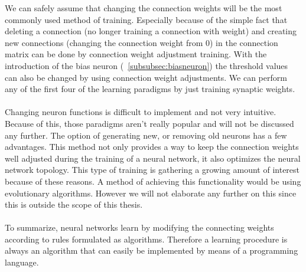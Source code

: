 \documentclass[pdftex,a4paper,12pt,twoside]{report}
\theoremstyle{plain} \newtheorem{theorem}{Theorem} \newtheorem{proposition}{Proposition} \newtheorem{lemma}{Lemma} \newtheorem*{corollary}{Corollary}
\theoremstyle{definition} \newtheorem{definition}{Definition} \newtheorem{conjecture}{Conjecture} \newtheorem*{example}{Example} \newtheorem{algorithm}{Algorithm}
\theoremstyle{remark} \newtheorem*{remark}{Remark} \newtheorem*{note}{Note} \newtheorem{case}{Case}
\begin{document}
We can safely assume that changing the connection weights will be the most commonly used method of training. Especially because of the simple fact that deleting a connection (no longer training a connection with weight) and creating new connections (changing the connection weight from 0) in the connection matrix can be done by connection weight adjustment training. With the introduction of the bias neuron (~\ref{subsubsec:biasneuron}) the threshold values can also be changed by using connection weight adjustments.  We can perform any of the first four of the learning paradigms by just training synaptic weights.\\\\Changing neuron functions is difficult to implement and not very intuitive. Because of this, those paradigms aren't really popular and will not be discussed any further. The option of generating new, or removing old neurons has a few advantages. This method not only provides a way to keep the connection weights well adjusted during the training of a neural network, it also optimizes the neural network topology. This type of training is gathering a growing amount of interest because of these reasons. A method of achieving this functionality would be using evolutionary algorithms. However we will not elaborate any further on this since this is outside the scope of this thesis.\\\\To summarize, neural networks learn by modifying the connecting weights according to rules formulated as algorithms. Therefore a learning procedure is always an algorithm that can easily be implemented by means of a programming language.
\end{document}

